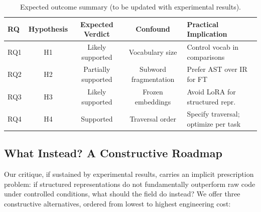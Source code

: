 \documentclass[pdflatex,sn-mathphys,Numbered]{sn-jnl}
\begin{document}
\begin{table}[tb]
\centering
\caption{Expected outcome summary (to be updated with experimental results).}\label{tab:summary}
\begin{tabular}{lcccl}
\toprule
RQ & Hypothesis & Expected Verdict & Confound & Practical Implication \\
\midrule
RQ1 & H1 & Likely supported & Vocabulary size & Control vocab in comparisons \\
RQ2 & H2 & Partially supported & Subword fragmentation & Prefer AST over IR for FT \\
RQ3 & H3 & Likely supported & Frozen embeddings & Avoid LoRA for structured repr. \\
RQ4 & H4 & Supported & Traversal order & Specify traversal; optimize per task \\
\bottomrule
\end{tabular}
\end{table}

\subsection{What Instead? A Constructive Roadmap}

Our critique, if sustained by experimental results, carries an implicit prescription problem: if structured representations do not fundamentally outperform raw code under controlled conditions, what should the field do instead? We offer three constructive alternatives, ordered from lowest to highest engineering cost:
\end{document}
